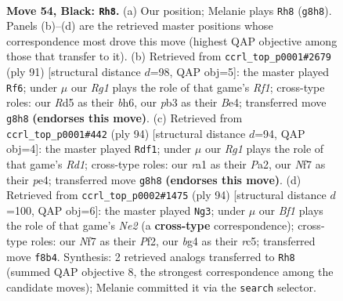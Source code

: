 \documentclass[11pt]{article}
\begin{document}
\clearpage

\begin{figure}[p]\centering
\begin{subfigure}{0.46\textwidth}\centering
\resizebox{\linewidth}{!}{%
\newchessgame
\chessboard[
  setfen={5br1/p4nkp/P7/3r4/5BB1/1Pp3KP/R1P3P1/R7 b - - 16 54},
  showmover=false,
  pgfstyle=straightmove, color=movearrow, markmove={g8-h8}
]}
\caption{}
\end{subfigure}\hfill
\begin{subfigure}{0.46\textwidth}\centering
\resizebox{\linewidth}{!}{%
\newchessgame
\chessboard[
  setfen={4rrk1/1p6/6pB/p2p4/P3b1BR/1nP3KP/1P6/3R4 b - - 4 46},
  showmover=false,
  pgfstyle=straightmove, color=movearrow, markmove={f8-f6}
]}
\caption{}
\end{subfigure}
\\[4pt]
\begin{subfigure}{0.46\textwidth}\centering
\resizebox{\linewidth}{!}{%
\newchessgame
\chessboard[
  setfen={8/2k1r2p/1pb3p1/p1n5/2P1pR2/7P/P3B1P1/3R2K1 w - - 6 48},
  showmover=false,
  pgfstyle=straightmove, color=movearrow, markmove={d1-f1}
]}
\caption{}
\end{subfigure}\hfill
\begin{subfigure}{0.46\textwidth}\centering
\resizebox{\linewidth}{!}{%
\newchessgame
\chessboard[
  setfen={8/5pk1/4bbp1/2r4p/8/7P/4NPP1/1R2R1K1 w - - 18 48},
  showmover=false,
  pgfstyle=straightmove, color=movearrow, markmove={e2-g3}
]}
\caption{}
\end{subfigure}
\caption{\textbf{Move 54, Black: \texttt{Rh8}.} (a) Our position; Melanie plays \texttt{Rh8} (\texttt{g8h8}). Panels (b)--(d) are the retrieved master positions whose correspondence most drove this move (highest QAP objective among those that transfer to it). (b) Retrieved from \texttt{ccrl\_top\_p0001\#2679} (ply 91) [structural distance $d$=98, QAP obj=5]: the master played \texttt{Rf6}; under $\mu$ our \emph{Rg1} plays the role of that game's \emph{Rf1}; cross-type roles: our \emph{R}d5 as their \emph{b}h6, our \emph{p}b3 as their \emph{B}e4; transferred move \texttt{g8h8} \textbf{(endorses this move)}. (c) Retrieved from \texttt{ccrl\_top\_p0001\#442} (ply 94) [structural distance $d$=94, QAP obj=4]: the master played \texttt{Rdf1}; under $\mu$ our \emph{Rg1} plays the role of that game's \emph{Rd1}; cross-type roles: our \emph{r}a1 as their \emph{P}a2, our \emph{N}f7 as their \emph{p}e4; transferred move \texttt{g8h8} \textbf{(endorses this move)}. (d) Retrieved from \texttt{ccrl\_top\_p0002\#1475} (ply 94) [structural distance $d$=100, QAP obj=6]: the master played \texttt{Ng3}; under $\mu$ our \emph{Bf1} plays the role of that game's \emph{Ne2} (a \textbf{cross-type} correspondence); cross-type roles: our \emph{N}f7 as their \emph{P}f2, our \emph{b}g4 as their \emph{r}c5; transferred move \texttt{f8b4}. Synthesis: 2 retrieved analogs transferred to \texttt{Rh8} (summed QAP objective 8, the strongest correspondence among the candidate moves); Melanie committed it via the \texttt{search} selector.}
\label{fig:thought-m107}
\end{figure}
\end{document}
